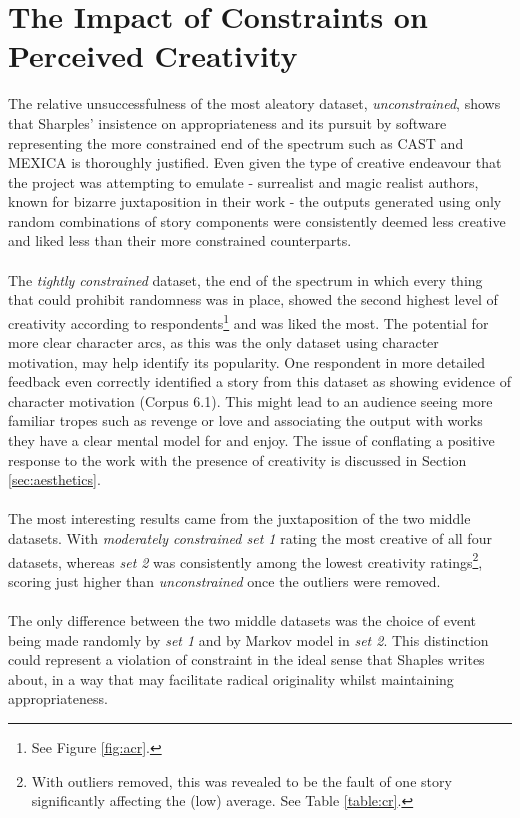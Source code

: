 \documentclass[letterpaper]{article}
\begin{document}
\section{The Impact of Constraints on Perceived Creativity}
The relative unsuccessfulness of the most aleatory dataset, \emph{unconstrained}, shows that Sharples' insistence on appropriateness and its pursuit by software representing the more constrained end of the spectrum such as CAST and MEXICA is thoroughly justified. Even given the type of creative endeavour that the project was attempting to emulate - surrealist and magic realist authors, known for bizarre juxtaposition in their work - the outputs generated using only random combinations of story components were consistently deemed less creative and liked less than their more constrained counterparts.\\ 
\\The \emph{tightly constrained} dataset, the end of the spectrum in which every thing that could prohibit randomness was in place, showed the second highest level of creativity according to respondents\footnote{See Figure \ref{fig:acr}.} and was liked the most. The potential for more clear character arcs, as this was the only dataset using character motivation, may help identify its popularity. One respondent in more detailed feedback even correctly identified a story from this dataset as showing evidence of character motivation (Corpus 6.1). This might lead to an audience seeing more familiar tropes such as revenge or love and associating the output with works they have a clear mental model for and enjoy. The issue of conflating a positive response to the work with the presence of creativity is discussed in Section \ref{sec:aesthetics}.\\
\\The most interesting results came from the juxtaposition of the two middle datasets. With \emph{moderately constrained set 1} rating the most creative of all four datasets, whereas \emph{set 2} was consistently among the lowest creativity ratings\footnote{With outliers removed, this was revealed to be the fault of one story significantly affecting the (low) average. See Table \ref{table:cr}.}, scoring just higher than \emph{unconstrained} once the outliers were removed.\\
\\The only difference between the two middle datasets was the choice of event being made randomly by \emph{set 1} and by Markov model in \emph{set 2}. This distinction could represent a violation of constraint in the ideal sense that Shaples writes about, in a way that may facilitate radical originality whilst maintaining appropriateness.\\
\end{document}
